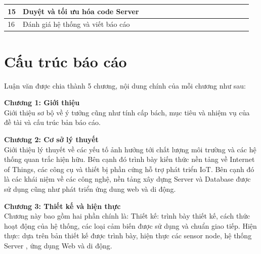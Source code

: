 \begin{landscape}
\begin{table}[]
\begin{tabular}{|l|l|l|l|l|l|l|l|l|l|l|l|l|l|l|l|l|}
15                                          & Duyệt và tối ưu hóa code Server                                                                                  &                          &                                                 &                          &                          &                          &                          &                                                 &                          &                          &                                                 &                          & \cellcolor[HTML]{000000} & \cellcolor[HTML]{000000} &                          &                          \\ \hline
16                                          & Đánh giá hệ thống và viết báo cáo                                                                                &                          &                                                 &                          &                          &                          &                          &                                                 &                          &                          &                                                 &                          &                          & \cellcolor[HTML]{000000} & \cellcolor[HTML]{000000} & \cellcolor[HTML]{000000} \\ \hline
\end{tabular}
\end{table}
\end{landscape}


\section{Cấu trúc báo cáo} %
Luận văn được chia thành 5 chương, nội dung chính của mỗi chương như sau:

\textbf{Chương 1: Giới thiệu}\\
Giới thiệu sơ bộ về ý tưởng cũng như tính cấp bách, mục tiêu và nhiệm vụ của đề tài và cấu trúc bản báo cáo.

\textbf{Chương 2: Cơ sở lý thuyết}\\
Giới thiệu lý thuyết về các yếu tố ảnh hưởng tới chất lượng môi trường và các hệ thống quan trắc hiện hữu. Bên cạnh đó trình bày kiến thức nền tảng về Internet of Things, các công cụ và thiết bị phần cứng hỗ trợ phát triển IoT. Bên cạnh đó là các khái niệm về các công nghệ, nền tảng xây dựng Server và Database được sử dụng cũng như phát triển ứng dung web và di động.

\textbf{Chương 3: Thiết kế và hiện thực}\\
Chương này bao gồm hai phần chính là:
Thiết kế: trình bày thiết kế, cách thức hoạt động của hệ thống, các loại cảm biến được sử dụng và chuẩn giao tiếp.
Hiện thực: dựa trên bản thiết kế được trình bày, hiện thực các sensor node, hệ thống Server , ứng dụng Web và di động.

